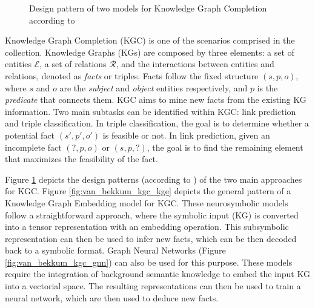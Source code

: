\begin{figure}[t!]
    \centering
    \caption{Design pattern of two models for Knowledge Graph Completion according to \cite{van_bekkum_modular_2021}}
    \label{fig:van_bekkum_kgc}
\end{figure}

Knowledge Graph Completion (KGC) \citep{nickel_review_ml_kg_2016,wang_kge_survey_2017} is one of the scenarios comprised in the collection. Knowledge Graphs (KGs) are composed by three elements: a set of entities $\mathcal{E}$, a set of relations $\mathcal{R}$, and the interactions between entities and relations, denoted as \textit{facts} or triples. Facts follow the fixed structure $(s,p,o)$, where $s$ and $o$ are the \textit{subject} and \textit{object} entities respectively, and $p$ is the \textit{predicate} that connects them. KGC aims to mine new facts from the existing KG information. Two main subtasks can be identified within KGC: link prediction and triple classification. In triple classification, the goal is to determine whether a potential fact $(s',p',o')$ is feasible or not. In link prediction, given an incomplete fact $(?,p,o)$ or $(s,p,?)$, the goal is to find the remaining element that maximizes the feasibility of the fact. 

Figure \ref{fig:van_bekkum_kgc} depicts the design patterns (according to \cite{van_bekkum_modular_2021}) of the two main approaches for KGC. Figure \ref{fig:van_bekkum_kgc_kge} depicts the general pattern of a Knowledge Graph Embedding model for KGC. These neurosymbolic models follow a straightforward approach, where the symbolic input (KG) is converted into a tensor representation with an embedding operation. This subsymbolic representation can then be used to infer new facts, which can be then decoded back to a symbolic format. Graph Neural Networks (Figure \ref{fig:van_bekkum_kgc_gnn}) can also be used for this purpose. These models require the integration of background semantic knowledge to embed the input KG into a vectorial space. The resulting representations can then be used to train a neural network, which are then used to deduce new facts.

